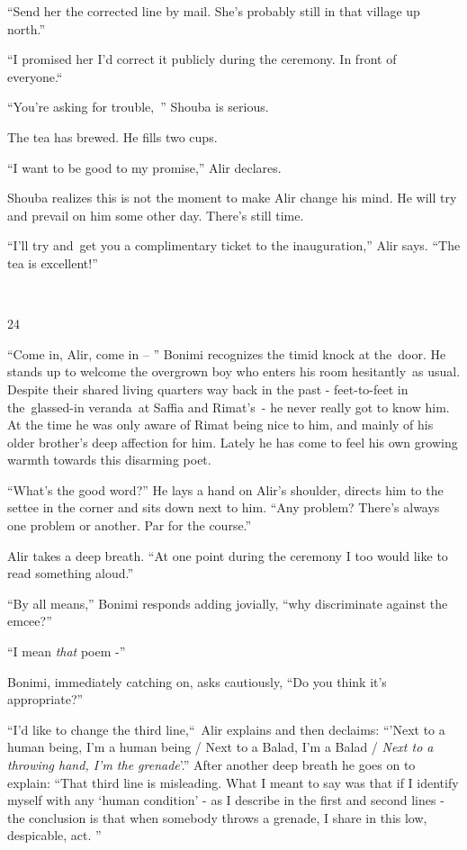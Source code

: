\documentclass[twoside,11pt]{book}
\begin{document}
``Send her the corrected line by mail. She's probably still in that village up north.'' 

``I promised her I'd correct it publicly during the ceremony. In front of everyone.``~ 

``You're asking for trouble,\ '' Shouba is serious.

The tea has brewed. He fills two cups. 

``I want to be good to my promise,'' Alir declares.

Shouba realizes this is not the moment to make Alir change his mind. He will try and prevail on him some other day.
There's still time. 

``I'll try and~get you a complimentary ticket to the inauguration,'' Alir says.
``The tea is excellent!''

~

24~

``Come in, Alir, come in -- '' Bonimi recognizes the timid knock at the~door. He stands up to
welcome the overgrown boy who enters his room hesitantly\ as usual. Despite their shared living quarters way back in
the past - feet-to-feet in the\ glassed-in veranda~at Saffia and Rimat's{\ }{}- he never really got to
know him. At the time he was only aware of Rimat being nice to him, and mainly of his older brother's deep affection
for him. Lately he has come to feel his own growing warmth towards this disarming poet. 

``What's the good word?'' He lays a hand on Alir's shoulder, directs him to the settee in the
corner and sits down next to him. ``Any problem? There's always one problem or another. Par for the
course.'' 

Alir takes a deep breath. ``At one point during the ceremony I too would like to read something
aloud.'' 

``By all means,'' Bonimi responds adding jovially, ``why discriminate against the
emcee?'' 

``I mean \textit{that} poem -'' 

Bonimi, immediately catching on, asks cautiously, ``Do you think it's appropriate?'' 

``I'd like to change the third line,``\ Alir explains and then declaims: ``'Next
to a human being, I'm a human being / Next to a Balad, I'm a Balad / \textit{Next to a throwing hand, I'm the
grenade}{}'.'' After another deep breath he goes on to explain: ``That third line is
misleading. What I meant to say was that if I identify myself with any `human condition' - as I describe in the first
and second lines -~ the conclusion is that when somebody throws a grenade, I share in this low, despicable, act.
'' 
\end{document}
